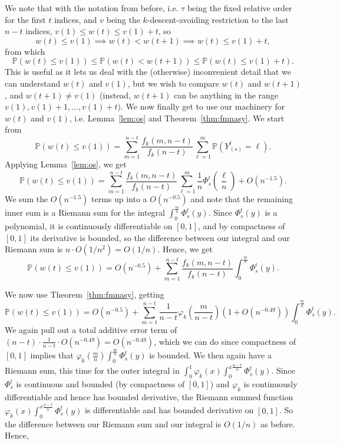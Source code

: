 \documentclass{amsart}
\theoremstyle{definition}
\begin{document}
We note that with the notation from before, i.e. $\tau$ being the fixed relative order for the first $t$ indices, and $v$ being the $k$-descent-avoiding restriction to the last $n-t$ indices, $v(1)\leq w(t)\leq v(1)+t$, so
\[w(t)\leq v(1)\implies w(t)<w(t+1)\implies w(t)\leq v(1)+t,\]
from which
\[\mathbb{P}(w(t)\leq v(1))\leq \mathbb{P}(w(t)<w(t+1))\leq \mathbb{P}(w(t)\leq v(1)+t).\]
This is useful as it lets us deal with the (otherwise) inconvenient detail that we can understand $w(t)$ and $v(1)$, but we wish to compare $w(t)$ and $w(t+1)$, and $w(t+1)\neq v(1)$ (instead, $w(t+1)$ can be anything in the range $v(1),v(1)+1,\ldots, v(1)+t)$. We now finally get to use our machinery for $w(t)$ and $v(1)$, i.e. Lemma~\ref{lem:os} and Theorem~\ref{thm:fmnasy}. We start from
\[\mathbb{P}\left(w(t)\leq v(1)\right)=\sum_{m=1}^{n-t}\frac{f_k(m,n-t)}{f_k(n-t)}\sum_{\ell=1}^{m}\mathbb{P}\left(Y^t_{(s)}=\ell\right).\]
Applying Lemma~\ref{lem:os}, we get
\[\mathbb{P}\left(w(t)\leq v(1)\right)=\sum_{m=1}^{n-t}\frac{f_k(m,n-t)}{f_k(n-t)}\sum_{\ell=1}^{m}\frac{1}{n}\Phi_s^t\left(\frac{\ell}{n}\right)+O(n^{-1.5}).\]
We sum the $O(n^{-1.5})$ terms up into a $O(n^{-0.5})$ and note that the remaining inner sum is a Riemann sum for the integral $\int_0^{\frac{m}{n}}\Phi_s^t(y)$. Since $\Phi_s^t(y)$ is a polynomial, it is continuously differentiable on $[0,1]$, and by compactness of $[0,1]$ its derivative is bounded, so the difference between our integral and our Riemann sum is $n\cdot O(1/n^2)=O(1/n)$. Hence, we get
\[\mathbb{P}\left(w(t)\leq v(1)\right)=O(n^{-0.5})+\sum_{m=1}^{n-t}\frac{f_k(m,n-t)}{f_k(n-t)}\int_0^{\frac{m}{n}}\Phi_s^t(y).\]

We now use Theorem~\ref{thm:fmnasy}, getting
\[\mathbb{P}\left(w(t)\leq v(1)\right)=O(n^{-0.5})+\sum_{m=1}^{n-t}\frac{1}{n-t}\varphi_k\left(\frac{m}{n-t}\right)\left(1+O\left(n^{-0.49}\right)\right)\int_0^{\frac{m}{n}}\Phi_s^t(y).\]
We again pull out a total additive error term of $(n-t)\cdot\frac{1}{n-t}\cdot O\left(n^{-0.49}\right)=O\left(n^{-0.49}\right)$, which we can do since compactness of $[0,1]$ implies that $\varphi_k(\frac{m}{n})\int_0^{\frac{m}{n}}\Phi_s^t(y)$ is bounded. We then again have a Riemann sum, this time for the outer integral in $\int_0^1\varphi_k(x)\int_{0}^{x\frac{n-t}{n}} \Phi_s^t(y)$. Since $\Phi_s^t$ is continuous and bounded (by compactness of $[0,1]$) and $\varphi_k$ is continuously differentiable and hence has bounded derivative, the Riemann summed function $\varphi_k(x)\int_{0}^{x\frac{n-t}{n}} \Phi_s^t(y)$ is differentiable and has bounded derivative on $[0,1]$. So the difference between our Riemann sum and our integral is $O(1/n)$ as before. Hence,
\end{document}
